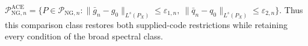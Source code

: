 \(\mathcal P_{\mathrm{NG},n}^{\mathrm{ACE}}=\{P\in\mathcal P_{\mathrm{NG},n}:\|\bar g_n-g_0\|_{L^s(P_X)}\le\varepsilon_{1,n},\ \|\bar q_n-q_0\|_{L^s(P_X)}\le\varepsilon_{2,n}\}\). Thus this comparison class restores both supplied-code restrictions while retaining every condition of the broad spectral class.